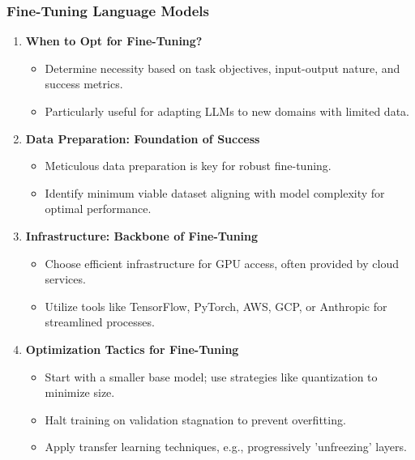 \begin{frame}[fragile]\frametitle{Fine-Tuning Language Models}
  \begin{enumerate}
    \item \textbf{When to Opt for Fine-Tuning?}
      \begin{itemize}
        \item Determine necessity based on task objectives, input-output nature, and success metrics.
        \item Particularly useful for adapting LLMs to new domains with limited data.
      \end{itemize}
    \item \textbf{Data Preparation: Foundation of Success}
      \begin{itemize}
        \item Meticulous data preparation is key for robust fine-tuning.
        \item Identify minimum viable dataset aligning with model complexity for optimal performance.
      \end{itemize}
    \item \textbf{Infrastructure: Backbone of Fine-Tuning}
      \begin{itemize}
        \item Choose efficient infrastructure for GPU access, often provided by cloud services.
        \item Utilize tools like TensorFlow, PyTorch, AWS, GCP, or Anthropic for streamlined processes.
      \end{itemize}
    \item \textbf{Optimization Tactics for Fine-Tuning}
      \begin{itemize}
        \item Start with a smaller base model; use strategies like quantization to minimize size.
        \item Halt training on validation stagnation to prevent overfitting.
        \item Apply transfer learning techniques, e.g., progressively 'unfreezing' layers.
      \end{itemize}
  \end{enumerate}
\end{frame}

